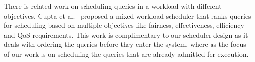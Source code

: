 
There is related work on scheduling queries in a workload with different objectives. 
Gupta et al.~\cite{gupta2009fair} proposed a mixed workload scheduler %
that ranks queries for scheduling based on multiple objectives like fairness, effectiveness, efficiency and QoS requirements. 
This work is complimentary to our scheduler design as it deals with ordering the queries before they enter the system, where as the focus of our work is on scheduling the queries that are already admitted for execution. 

